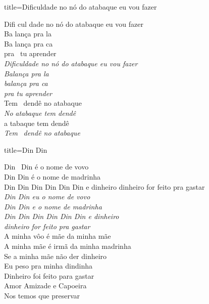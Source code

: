 \documentclass[fontsize=14pt, paper=a4, twoside, DIV=20]{scrreprt} %
\begin{document}
\begin{multicols*}{2}
\columnbreak

\begin{song}{title={Dificuldade no nó do atabaque eu vou fazer}}
        \begin{verse*}
            Difi cul dade no nó do atabaque eu vou fazer\\
            Ba lança pra la\\
            Ba lança pra ca\\
            pra \ tu aprender\\
            \textit{Dificuldade no nó do atabaque eu vou fazer}\\
            \textit{Balança pra la}\\
            \textit{balança pra ca}\\
            \textit{pra tu aprender}\\
            Tem \ dendê no atabaque\\
            \textit{No} \textit{atabaque tem dendê}\\
            a tabaque tem dendê\\
            \textit{Tem} \ \textit{dendê no atabaque}\\
        \end{verse*}
\end{song}

\begin{song}{title={Din Din}}
        \begin{verse*}
            Din \ Din é o nome de vovo\\
            Din Din é o nome de madrinha\\
            Din Din Din Din Din Din e dinheiro dinheiro for feito pra gastar\\
            \textit{Din Din eu o nome de vovo}\\
            \textit{Din Din e o nome de madrinha}\\
            \textit{Din Din Din Din Din Din e dinheiro}\\
            \textit{dinheiro for feito pra gastar}\\
            A minha vôo é mãe da minha mãe\\
            A minha mãe é irmã da minha madrinha\\
            Se a minha mãe não der dinheiro\\
            Eu peso pra minha dindinha\\
            Dinheiro foi feito para gastar\\
            Amor Amizade e Capoeira\\
            Nos temos que preservar\\
        \end{verse*}
\end{song}



\end{multicols*}
\end{document}
